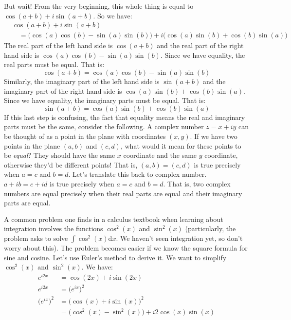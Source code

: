 \documentclass{article}
\begin{document}
    But wait! From the very beginning, this whole thing is equal to
    $\cos(a+b)+i\sin(a+b)$. So we have:
    \begin{align}
        &\cos(a+b)+i\sin(a+b)\nonumber\\
        &\quad=\big(\cos(a)\cos(b)-\sin(a)\sin(b)\big)+
            i\big(\cos(a)\sin(b)+\cos(b)\sin(a)\big)
    \end{align}
    The real part of the left hand side is $\cos(a+b)$ and the real part of
    the right hand side is $\cos(a)\cos(b)-\sin(a)\sin(b)$. Since we have
    equality, the real parts must be equal. That is:
    \begin{equation}
        \cos(a+b)=\cos(a)\cos(b)-\sin(a)\sin(b)
    \end{equation}
    Similarly, the imaginary part of the left hand side is $\sin(a+b)$ and the
    imaginary part of the right hand side is
    $\cos(a)\sin(b)+\cos(b)\sin(a)$. Since we have equality, the imaginary
    parts must be equal. That is:
    \begin{equation}
        \sin(a+b)=\cos(a)\sin(b)+\cos(b)\sin(a)
    \end{equation}
    If this last step is confusing, the fact that equality means the real and
    imaginary parts must be the same, consider the following. A complex number
    $z=x+iy$ can be thought of as a point in the plane with coordinates
    $(x,y)$. If we have two points in the plane $(a,b)$ and $(c,d)$, what would
    it mean for these points to be \textit{equal}? They should have the same
    $x$ coordinate and the same $y$ coordinate, otherwise they'd be different
    points! That is, $(a,b)=(c,d)$ is true precisely when $a=c$ and $b=d$.
    Let's translate this back to complex number. $a+ib=c+id$ is true precisely
    when $a=c$ and $b=d$. That is, two complex numbers are equal precisely when
    their real parts are equal and their imaginary parts are equal.
    \par\hfill\par
    A common problem one finds in a calculus textbook when learning about
    integration involves the functions $\cos^{2}(x)$ and $\sin^{2}(x)$
    (particularly, the problem asks to solve $\int\cos^{2}(x)\textrm{d}x$. We
    haven't seen integration yet, so don't worry about this). The problem
    becomes easier if we know the square formula for sine and cosine. Let's
    use Euler's method to derive it. We want to simplify $\cos^{2}(x)$ and
    $\sin^{2}(x)$. We have:
    \begin{align}
        e^{i2x}&=\cos(2x)+i\sin(2x)\tag{Euler's Formula}\\
        e^{i2x}&=\big(e^{ix}\big)^{2}\tag{Exponential Property}\\
        \big(e^{ix}\big)^{2}&=\big(\cos(x)+i\sin(x)\big)^{2}
            \tag{Euler's Formula}\\
            &=\big(\cos^{2}(x)-\sin^{2}(x)\big)+i2\cos(x)\sin(x)
    \end{align}
\end{document}
